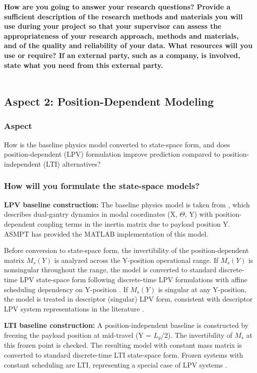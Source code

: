 \textbf{How are you going to answer your research questions? Provide a sufficient description of the research methods
and materials you will use during your project so that your supervisor can assess the appropriateness of your
research approach, methods and materials, and of the quality and reliability of your data. What resources will
you use or require? If an external party, such as a company, is involved, state what you need from this external
party. }
\\
\\
\subsection{Aspect 2: Position-Dependent Modeling}

\subsubsection*{Aspect}
How is the baseline physics model converted to state-space form, and does position-dependent (LPV) formulation improve prediction compared to position-independent (LTI) alternatives?

\subsubsection{How will you formulate the state-space models?}

\textbf{LPV baseline construction:}
The baseline physics model is taken from \citet{garcia2013model}, which describes dual-gantry dynamics in modal coordinates (X, $\Theta$, Y) with position-dependent coupling terms in the inertia matrix due to payload position Y. ASMPT has provided the MATLAB implementation of this model. 

Before conversion to state-space form, the invertibility of the position-dependent matrix $M_s(Y)$ is analyzed across the Y-position operational range. If $M_s(Y)$ is nonsingular throughout the range, the model is converted to standard discrete-time LPV state-space form following discrete-time LPV formulations \citep{toth2010discretization} with affine scheduling dependency on Y-position \citep{toth2007discrete}. If $M_s(Y)$ is singular at any Y-position, the model is treated in descriptor (singular) LPV form, consistent with descriptor LPV system representations in the literature \citep{masubuchi2003synthesis, chadli2008stabilisation}.

\textbf{LTI baseline construction:}
A position-independent baseline is constructed by freezing the payload position at mid-travel (Y = $L_y$/2). The invertibility of $M_s$ at this frozen point is checked. The resulting model with constant mass matrix is converted to standard discrete-time LTI state-space form. Frozen systems with constant scheduling are LTI, representing a special case of LPV systems \citep{toth2010modeling}.

